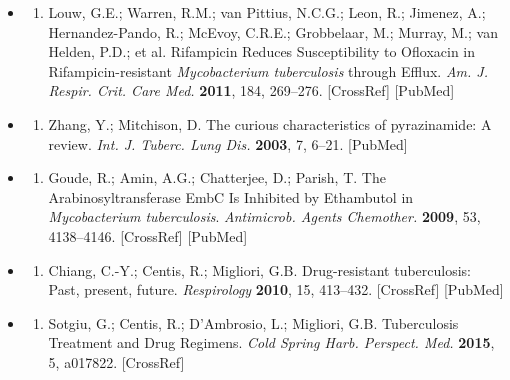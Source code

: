 \documentclass{article}
\begin{document}
\begin{itemize}
\begin{enumerate}
\end{enumerate}

\item \begin{enumerate}
\item 
Louw, G.E.; Warren, R.M.; van Pittius, N.C.G.; Leon, R.; Jimenez, A.; Hernandez-Pando, R.; McEvoy, C.R.E.; Grobbelaar, M.; Murray, M.; van Helden, P.D.; et al. Rifampicin Reduces Susceptibility to Ofloxacin in Rifampicin-resistant \textit{Mycobacterium tuberculosis} through Efflux. \textit{Am. J. Respir. Crit. Care Med.} \textbf{2011}, 184, 269–276. [CrossRef] [PubMed]

\end{enumerate}

\item \begin{enumerate}
\item 
Zhang, Y.; Mitchison, D. The curious characteristics of pyrazinamide: A review. \textit{Int. J. Tuberc. Lung Dis.} \textbf{2003}, 7, 6–21. [PubMed]

\end{enumerate}

\item \begin{enumerate}
\item 
Goude, R.; Amin, A.G.; Chatterjee, D.; Parish, T. The Arabinosyltransferase EmbC Is Inhibited by Ethambutol in \textit{Mycobacterium tuberculosis}. \textit{Antimicrob. Agents Chemother.} \textbf{2009}, 53, 4138–4146. [CrossRef] [PubMed]

\end{enumerate}

\item \begin{enumerate}
\item 
Chiang, C.-Y.; Centis, R.; Migliori, G.B. Drug-resistant tuberculosis: Past, present, future. \textit{Respirology} \textbf{2010}, 15, 413–432. [CrossRef] [PubMed]

\end{enumerate}

\item \begin{enumerate}
\item 
Sotgiu, G.; Centis, R.; D'Ambrosio, L.; Migliori, G.B. Tuberculosis Treatment and Drug Regimens. \textit{Cold Spring Harb. Perspect. Med.} \textbf{2015}, 5, a017822. [CrossRef]

\end{enumerate}


\end{itemize}
\end{document}
